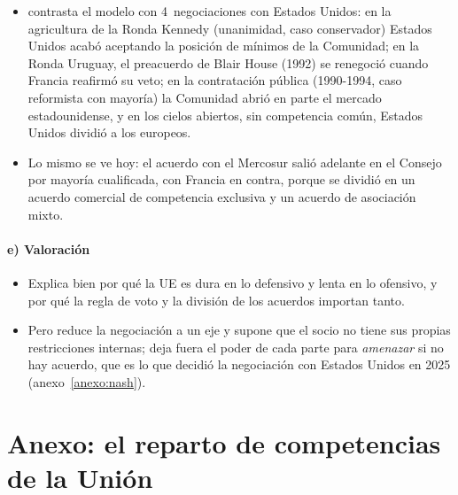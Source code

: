 \documentclass[11pt]{article}
\begin{document}
\begin{itemize}
\item \textcite{Meunier2005Trading} contrasta el modelo con 4~negociaciones con Estados Unidos: en la agricultura de la Ronda Kennedy (unanimidad, caso conservador) Estados Unidos acabó aceptando la posición de mínimos de la Comunidad; en la Ronda Uruguay, el preacuerdo de Blair House (1992) se renegoció cuando Francia reafirmó su veto; en la contratación pública (1990-1994, caso reformista con mayoría) la Comunidad abrió en parte el mercado estadounidense, y en los cielos abiertos, sin competencia común, Estados Unidos dividió a los europeos.
\item Lo mismo se ve hoy: el acuerdo con el Mercosur salió adelante en el Consejo por mayoría cualificada, con Francia en contra, porque se dividió en un acuerdo comercial de competencia exclusiva y un acuerdo de asociación mixto\nocite{Consejo2026Mercosur}.
\end{itemize}

\paragraph{e) Valoración}

\begin{itemize}
\item Explica bien por qué la UE es dura en lo defensivo y lenta en lo ofensivo, y por qué la regla de voto y la división de los acuerdos importan tanto.
\item Pero reduce la negociación a un eje y supone que el socio no tiene sus propias restricciones internas; deja fuera el poder de cada parte para \emph{amenazar} si no hay acuerdo, que es lo que decidió la negociación con Estados Unidos en 2025 (anexo~\ref{anexo:nash}).
\end{itemize}

\section{Anexo: el reparto de competencias\cortetitulo{} de la Unión}\label{anexo:competencias}
\end{document}
